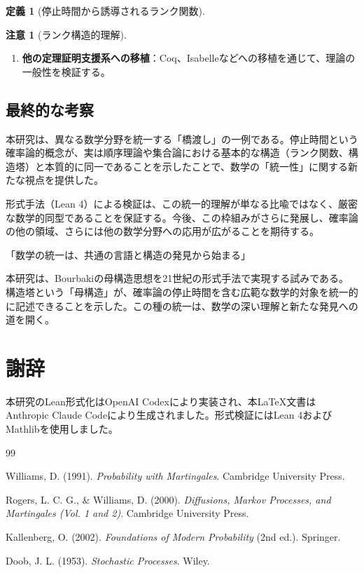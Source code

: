 \documentclass[a4paper,11pt]{ltjsarticle}
\theoremstyle{definition}
\newtheorem{definition}[theorem]{定義}
\newtheorem{remark}[theorem]{注意}
\begin{document}
\begin{definition}[停止時間から誘導されるランク関数]
\begin{remark}[ランク構造的理解]
\begin{enumerate}
\item \textbf{他の定理証明支援系への移植}：Coq、Isabelleなどへの移植を通じて、理論の一般性を検証する。
\end{enumerate}

\subsection{最終的な考察}

本研究は、異なる数学分野を統一する「橋渡し」の一例である。停止時間という確率論的概念が、実は順序理論や集合論における基本的な構造（ランク関数、構造塔）と本質的に同一であることを示したことで、数学の「統一性」に関する新たな視点を提供した。

形式手法（Lean 4）による検証は、この統一的理解が単なる比喩ではなく、厳密な数学的同型であることを保証する。今後、この枠組みがさらに発展し、確率論の他の領域、さらには他の数学分野への応用が広がることを期待する。

\begin{tcolorbox}[colback=green!5!white,colframe=green!75!black,title=Bourbakiの精神の継承]
「数学の統一は、共通の言語と構造の発見から始まる」

本研究は、Bourbakiの母構造思想を21世紀の形式手法で実現する試みである。構造塔という「母構造」が、確率論の停止時間を含む広範な数学的対象を統一的に記述できることを示した。この種の統一は、数学の深い理解と新たな発見への道を開く。
\end{tcolorbox}

\section*{謝辞}

本研究のLean形式化はOpenAI Codexにより実装され、本\LaTeX 文書はAnthropic Claude Codeにより生成されました。形式検証にはLean 4およびMathlibを使用しました。

\begin{thebibliography}{99}

Williams, D. (1991).
\textit{Probability with Martingales}.
Cambridge University Press.

Rogers, L. C. G., \& Williams, D. (2000).
\textit{Diffusions, Markov Processes, and Martingales (Vol. 1 and 2)}.
Cambridge University Press.

Kallenberg, O. (2002).
\textit{Foundations of Modern Probability} (2nd ed.).
Springer.

Doob, J. L. (1953).
\textit{Stochastic Processes}.
Wiley.


\end{thebibliography}
\end{remark}
\end{definition}
\end{document}
